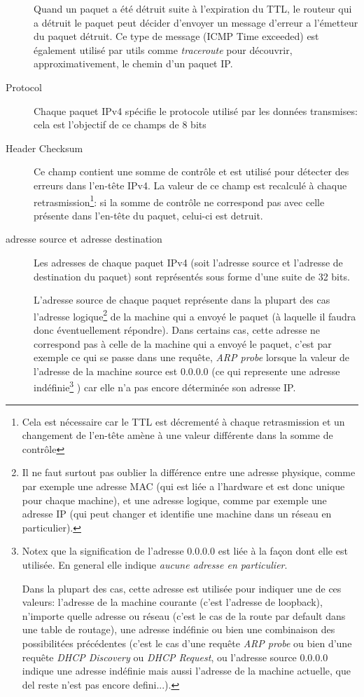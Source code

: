 \begin{description}
Quand un paquet a été détruit suite à l'expiration du TTL, le routeur qui a
détruit le paquet peut décider d'envoyer un message d'erreur a l'émetteur du
paquet détruit. Ce type de message (ICMP Time exceeded) est également utilisé par
utils comme {\it traceroute} pour découvrir, approximativement, le chemin 
d'un paquet IP.

\item [Protocol]
Chaque paquet IPv4 spécifie le protocole utilisé par les données transmises:
cela est l'objectif de ce champs de 8 bits 

\item [Header Checksum]
Ce champ contient une somme de contrôle et est utilisé pour détecter des 
erreurs dans l'en-tête IPv4. La valeur de ce champ est recalculé à
chaque retrasmission\footnote {Cela est nécessaire car le TTL est décrementé
à chaque retrasmission et un changement de l'en-tête amène à une valeur différente
dans la somme de contrôle}: si la somme de contrôle ne correspond pas avec celle 
présente dans l'en-tête du paquet, celui-ci est detruit.


\item [adresse source et adresse destination]
Les adresses de chaque paquet IPv4 (soit l'adresse source et l'adresse de
destination du paquet) sont représentés sous forme d'une suite de 32 bits.

L'adresse source de chaque paquet représente dans la plupart des cas
l'adresse logique\footnote {Il ne faut surtout pas oublier la différence entre
une adresse physique, comme par exemple une adresse MAC (qui est liée a
l'hardware et est donc unique pour chaque machine), et une adresse logique,
comme par exemple une adresse IP (qui peut changer et identifie une machine
dans un réseau en particulier).} de la machine qui a envoyé le paquet
(à laquelle il faudra donc éventuellement répondre).  Dans certains cas,
 cette adresse ne correspond pas à celle de la machine qui a envoyé
le paquet, c'est par exemple ce qui se passe dans une requête, {\it ARP probe}
lorsque la valeur de l'adresse de la machine source est 0.0.0.0 (ce qui represente
une adresse indéfinie\footnote {Notex que la signification de l'adresse 0.0.0.0
est liée à la façon dont elle est utilisée. En general elle indique {\it aucune
adresse en particulier}. 

Dans la plupart des cas, cette adresse est utilisée
pour indiquer une de ces valeurs: l'adresse de la machine courante (c'est
l'adresse de loopback), n'importe quelle adresse ou réseau (c'est le cas de la
route par default dans une table de routage), une adresse indéfinie ou bien une
combinaison des possibilitées précédentes (c'est le cas d'une requête {\it ARP
probe} ou bien d'une requête {\it DHCP Discovery} ou {\it DHCP Request}, ou
 l'adresse source 0.0.0.0 indique une adresse indéfinie mais aussi l'adresse
de la machine actuelle, que del reste n'est pas encore defini...).}
) car elle n'a pas encore déterminée son adresse IP. 


\end{description}
